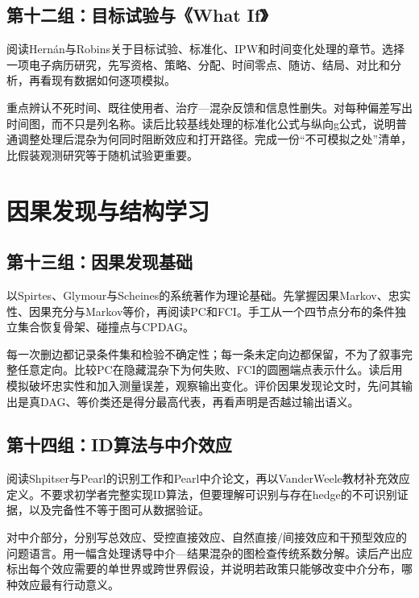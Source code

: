 \subsection*{第十二组：目标试验与《What If》}

阅读Hernán与Robins关于目标试验、标准化、IPW和时间变化处理的章节\parencite{hernanrobins2016,hernanrobins2020}。选择一项电子病历研究，先写资格、策略、分配、时间零点、随访、结局、对比和分析，再看现有数据如何逐项模拟。

重点辨认不死时间、既往使用者、治疗---混杂反馈和信息性删失。对每种偏差写出时间图，而不只是列名称。读后比较基线处理的标准化公式与纵向g公式，说明普通调整处理后混杂为何同时阻断效应和打开路径。完成一份“不可模拟之处”清单，比假装观测研究等于随机试验更重要。

\section{因果发现与结构学习}

\subsection*{第十三组：因果发现基础}

以Spirtes、Glymour与Scheines的系统著作为理论基础\parencite{spirtes2000}。先掌握因果Markov、忠实性、因果充分与Markov等价，再阅读PC和FCI。手工从一个四节点分布的条件独立集合恢复骨架、碰撞点与CPDAG。

每一次删边都记录条件集和检验不确定性；每一条未定向边都保留，不为了叙事完整任意定向。比较PC在隐藏混杂下为何失败、FCI的圆圈端点表示什么。读后用模拟破坏忠实性和加入测量误差，观察输出变化。评价因果发现论文时，先问其输出是真DAG、等价类还是得分最高代表，再看声明是否越过输出语义。

\subsection*{第十四组：ID算法与中介效应}

阅读Shpitser与Pearl的识别工作和Pearl中介论文，再以VanderWeele教材补充效应定义\parencite{shpitserpearl2006,pearl2001mediation,vanderweele2015}。不要求初学者完整实现ID算法，但要理解可识别与存在hedge的不可识别证据，以及完备性不等于图可从数据验证。

对中介部分，分别写总效应、受控直接效应、自然直接/间接效应和干预型效应的问题语言。用一幅含处理诱导中介---结果混杂的图检查传统系数分解。读后产出应标出每个效应需要的单世界或跨世界假设，并说明若政策只能够改变中介分布，哪种效应最有行动意义。

